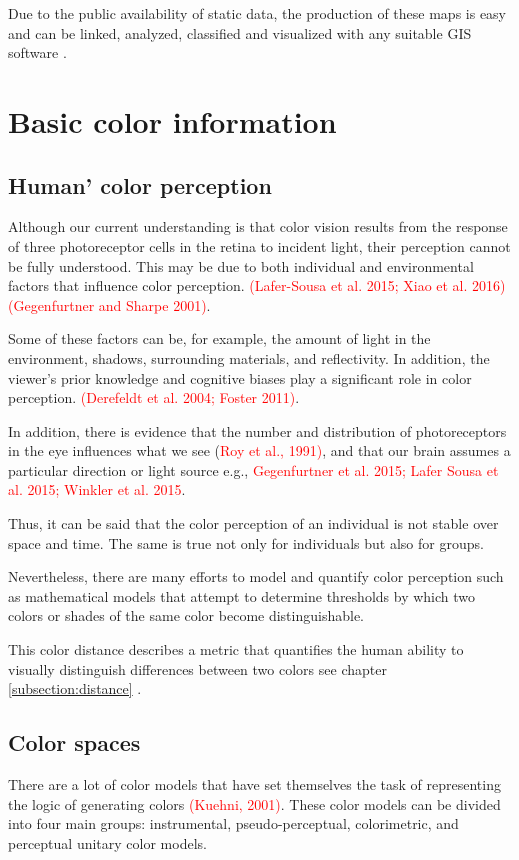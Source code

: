Due to the public availability of static data, the production of these maps is easy and can be linked, analyzed, classified and visualized with any suitable GIS software \parencite{hruby2016}.

\section{Basic color information}

\subsection{Human' color perception}
Although our current understanding is that color vision results from the response of three photoreceptor cells in the retina to incident light, their perception cannot be fully understood. This may be due to both individual and environmental factors that influence color perception. \textcolor{red}{(Lafer-Sousa et al. 2015; Xiao et al. 2016) (Gegenfurtner and Sharpe 2001)}. 

Some of these factors can be, for example, the amount of light in the environment, shadows, surrounding materials, and reflectivity. In addition, the viewer's prior knowledge and cognitive biases play a significant role in color perception. \textcolor{red}{(Derefeldt et al. 2004; Foster 2011)}. 

In addition, there is evidence that the number and distribution of photoreceptors in the eye influences what we see (\textcolor{red}{Roy et al., 1991)}, and that our brain assumes a particular direction or light source e.g., \textcolor{red}{Gegenfurtner et al. 2015; Lafer Sousa et al. 2015; Winkler et al. 2015}. 

Thus, it can be said that the color perception of an individual is not stable over space and time. The same is true not only for individuals but also for groups.  

Nevertheless, there are many efforts to model and quantify color perception such as mathematical models that attempt to determine thresholds by which two colors or shades of the same color become distinguishable. 

This color distance describes a metric that quantifies the human ability to visually distinguish differences between two colors see chapter \ref{subsection:distance} \parencite{coltekin2017}.

\subsection{Color spaces}
There are a lot of color models that have set themselves the task of representing the logic of generating colors \textcolor{red}{(Kuehni, 2001)}. These color models can be divided into four main groups: instrumental, pseudo-perceptual, colorimetric, and perceptual unitary color models.

